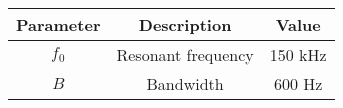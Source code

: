 \setlength{\arrayrulewidth}{0.3mm}
\setlength{\tabcolsep}{20pt}
\renewcommand{\arraystretch}{1.3}


\begin{tabular}{|c|c|c|}
\hline
Parameter & Description & Value\\
\hline
$f_0$ & Resonant frequency & 150 kHz\\
\hline
$B$ & Bandwidth & 600 Hz\\
\hline
\end{tabular}